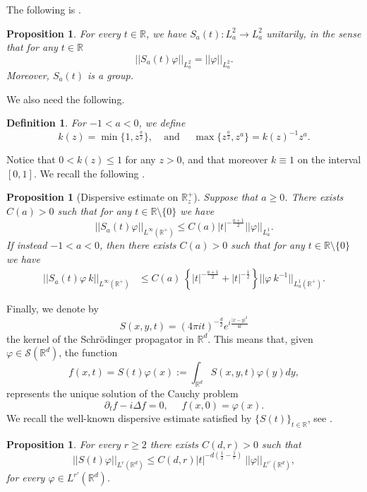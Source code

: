 \documentclass[11pt,letter]{amsart}
\def \R {\mathbb{R}}
\def \vf{\varphi}
\newcommand{\Rd}{\mathbb R^d}
\newcommand{\p}{\partial}
\numberwithin{equation}{section}
\newtheorem{proposition}[theorem]{Proposition}
\newtheorem{definition}[theorem]{Definition}
\numberwithin{equation}{section}
\begin{document}
The following is \cite[Prop. 3.1]{GS}.



\begin{proposition}\label{P:uni}
For every $t\in \R$, we have $S_a(t): L^2_a\to L^2_a$ unitarily, in the sense that for any $t\in \R$
\[
||S_a(t)\vf||_{L^2_a} = ||\vf||_{L^2_a}.
\]
Moreover, $S_a(t)$ is a group.
\end{proposition}

We also need the following. 
\begin{definition}\label{D:mn}
For $-1<a<0$, we define 
\[
k(z) = \min\{1,z^{\frac a2}\},\ \ \ \ \ \text{and}\ \ \ \ \ \ \max\{z^{\frac a2},z^a\} = k(z)^{-1} z^a.
\]  
\end{definition}

Notice that $0<k(z)\le 1$ for any $z>0$, and that moreover $k\equiv 1$ on the interval $[0,1]$.
We recall the following \cite[Prop. 3.4]{GS}.

\begin{proposition}[Dispersive estimate on $\R^+_z$]\label{P:dis}
Suppose that $a\ge 0$. There exists $C(a)>0$ such that for any $t\in \R\setminus\{0\}$ we have 
\begin{equation}\label{good}
||S_a(t) \vf||_{L^\infty(\R^+)}\le C(a) |t|^{-\frac{a+1}2} ||\vf||_{L^1_a}.
\end{equation}
If instead $-1<a<0$, then there exists $C(a)>0$ such that for any $t\in \R\setminus\{0\}$ we have 
\begin{align}\label{weight}
||S_a(t)\vf\ k||_{L^\infty(\R^+)} & \le C(a)\ \left\{|t|^{-\frac{a+1}2} + |t|^{-\frac{1}2}\right\} ||\vf\ k^{-1}||_{L^1_a(\R^+)}.
\end{align} 
\end{proposition}

Finally, we denote by
\begin{equation}\label{S}
S(x,y,t) =  (4\pi i t)^{-\frac d2} e^{i \frac{|x-y|^2}{4t}}
\end{equation}
the kernel of the Schr\"odinger propagator in $\Rd$.
This means that, given $\vf\in \mathscr S(\Rd)$, the function
\[
f(x,t) = S(t)\vf(x) := \int_{\Rd} S(x,y,t) \vf(y) dy,
\]
represents the unique solution of the Cauchy problem 
\[
\p_t f - i \Delta f = 0,\ \ \ \ \ \ f(x,0) = \vf(x).
\]
We recall the well-known dispersive estimate satisfied by $\{S(t)\}_{t\in \R}$, see \cite{GV, GV2, SuSu, Caze}.

\begin{proposition}\label{P:fundis}
For every $r\ge 2$ there exists $C(d,r)>0$ such that
\[
||S(t)\vf||_{L^r(\Rd)}\le C(d,r)|t|^{-d(\frac 12 - \frac 1r)}\ ||\vf||_{L^{r'}(\Rd)},
\]
for every $\vf\in L^{r'}(\Rd)$.
\end{proposition}
\end{document}
